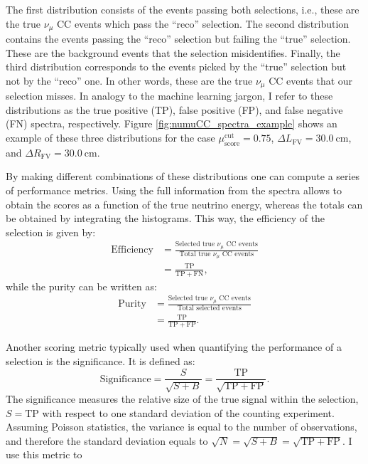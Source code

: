 The first distribution consists of the events passing both selections, i.e., these are the true $\nu_{\mu}$ CC events which pass the ``reco'' selection. The second distribution contains the events passing the ``reco'' selection but failing the ``true'' selection. These are the background events that the selection misidentifies. Finally, the third distribution corresponds to the events picked by the ``true'' selection but not by the ``reco'' one. In other words, these are the true $\nu_{\mu}$ CC events that our selection misses. In analogy to the machine learning jargon, I refer to these distributions as the true positive (TP), false positive (FP), and false negative (FN) spectra, respectively. Figure \ref{fig:numuCC_spectra_example} shows an example of these three distributions for the case $\mu_{\mathrm{score}}^{\mathrm{cut}} = 0.75$, $\Delta L_{\mathrm{FV}} = 30.0 ~ \mathrm{cm}$, and $\Delta R_{\mathrm{FV}} = 30.0 ~ \mathrm{cm}$.

By making different combinations of these distributions one can compute a series of performance metrics. Using the full information from the spectra allows to obtain the scores as a function of the true neutrino energy, whereas the totals can be obtained by integrating the histograms. This way, the efficiency of the selection is given by:
\begin{equation}
    \begin{split}
        \mathrm{Efficiency} &= \frac{\text{Selected true } \nu_{\mu} \text{ CC events}}{\text{Total true } \nu_{\mu} \text{ CC events}}\\
        &= \frac{\mathrm{TP}}{\mathrm{TP}+\mathrm{FN}},
    \end{split}
\end{equation}
while the purity can be written as:
\begin{equation}
    \begin{split}
        \mathrm{Purity} &= \frac{\text{Selected true } \nu_{\mu} \text{ CC events}}{\text{Total selected events}}\\
        &= \frac{\mathrm{TP}}{\mathrm{TP}+\mathrm{FP}}.
    \end{split}
\end{equation}

Another scoring metric typically used when quantifying the performance of a selection is the significance. It is defined as:
\begin{equation}
    \mathrm{Significance} = \frac{S}{\sqrt{S+B}} = \frac{\mathrm{TP}}{\sqrt{\mathrm{TP} + \mathrm{FP}}}.
\end{equation}
The significance measures the relative size of the true signal within the selection, $S=\mathrm{TP}$ with respect to one standard deviation of the counting experiment. Assuming Poisson statistics, the variance is equal to the number of observations, and therefore the standard deviation equals to $\sqrt{N}=\sqrt{S+B}=\sqrt{\mathrm{TP} + \mathrm{FP}}$. I use this metric to 

